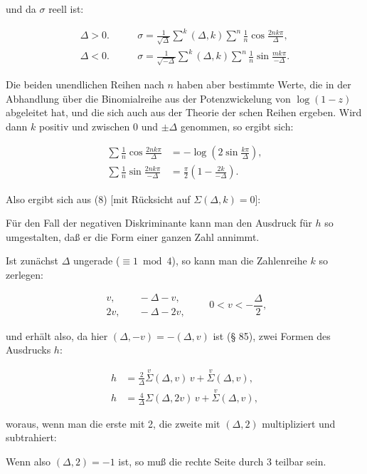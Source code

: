 und da $\sigma$ reell ist:

\[
\begin{aligned}
\Delta>0. &\qquad \sigma = \frac{1}{\sqrt{\Delta}}\overset{k}{\sum}(\Delta,k)\overset{n}{\sum}\frac{1}{n}\cos\frac{2nk\pi}{\Delta},\\
\Delta<0. &\qquad \sigma = \frac{1}{\sqrt{-\Delta}}\overset{k}{\sum}(\Delta,k)\overset{n}{\sum}\frac{1}{n}\sin\frac{mk\pi}{-\Delta}. %
\end{aligned}
\]

Die beiden unendlichen Reihen nach $n$ haben aber bestimmte
Werte, die  in der Abhandlung über die Binomialreihe
aus der Potenzwickelung von $\log(1-z)$ abgeleitet hat, und die sich %
auch aus der Theorie der schen Reihen ergeben. Wird
dann $k$ positiv und zwischen $0$ und $\pm\Delta$ genommen, so ergibt sich:

\[
\begin{aligned}
\sum\frac{1}{n}\cos\frac{2nk\pi}{\Delta} &= -\log\left(2\sin\frac{k\pi}{\Delta}\right),\\
\sum\frac{1}{n}\sin\frac{2nk\pi}{-\Delta} &= \frac{\pi}{2}\left(1 - \frac{2k}{-\Delta}\right).
\end{aligned}
\]

Also ergibt sich aus (8) [mit Rücksicht auf $\Sigma(\Delta,k) = 0$]:


Für den Fall der negativen Diskriminante kann man den
Ausdruck für $h$ so umgestalten, daß er die Form einer ganzen
Zahl annimmt.

Ist zunächst $\Delta$ ungerade ($\equiv 1 \bmod 4$), so kann man die
Zahlenreihe $k$ so zerlegen:

\[
\begin{aligned}
v, &\quad -\Delta - v,\\
2v, &\quad -\Delta - 2v,
\end{aligned}
\qquad 0 < v < -\frac{\Delta}{2},
\]

und erhält also, da hier $(\Delta,-v) = -(\Delta,v)$ ist (§ 85), zwei
Formen des Ausdrucks $h$:

\[
\begin{aligned}
h &= \frac{2}{\Delta}\overset{v}{\Sigma}(\Delta,v)\,v + \overset{v}{\Sigma}(\Delta,v),\\
h &= \frac{4}{\Delta}\Sigma(\Delta,2v)\,v + \overset{v}{\Sigma}(\Delta,v),
\end{aligned}
\]

woraus, wenn man die erste mit 2, die zweite mit $(\Delta,2)$ multipliziert
und subtrahiert:


Wenn also $(\Delta,2) = -1$ ist, so muß die rechte Seite
durch 3 teilbar sein.
